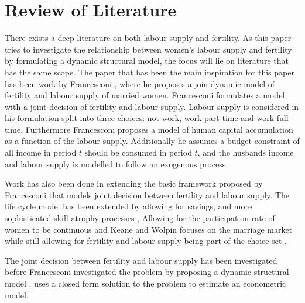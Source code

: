 \section{Review of Literature}\label{sec:lit_review}

There exists a deep literature on both labour supply and fertility.
As this paper tries to investigate the relationship between women's labour supply and fertility by formulating a dynamic  structural model, the focus will lie on literature that has the same scope. The paper that has been the main inspiration for this paper has been work by Francesconi \parencite{francesconi_joint_2002}, where he proposes a join dynamic model of fertility and labour supply of married women. Francesconi formulates a model with a joint decision of fertility and labour supply. Labour supply is considered in his formulation split into three choices: not work, work part-time and work full-time. Furthermore Francesconi proposes a model of human capital accumulation as a function of the labour supply. Additionally he assumes a budget constraint of all income in period $t$ should be consumed in period $t$, and the husbands income and labour supply is modelled to follow an exogenous process. 

Work has also been done in extending the basic framework proposed by Francesconi that models joint decision between fertility and labour supply.  The life cycle model has been extended by allowing for savings, and more sophisticated skill atrophy processes \parencite{adda_career_2011}, Allowing for the participation rate of women to be continuous \parencite{gayle_life-cyle_2006} and Keane and Wolpin focuses on the marriage market while still allowing for fertility and labour supply being part of the choice set \parencite{keane_role_2010}. \parencite{joseph_female_2007}

The joint decision between fertility and labour supply has been investigated before Francesconi investigated the problem by proposing a dynamic structural model \parencite{francesconi_joint_2002}. \parencite{moffitt_estimation_1984} uses a closed form solution to the problem to estimate an econometric model. \parencite{}
